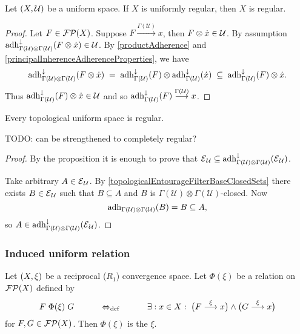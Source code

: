 \begin{proposition}
Let $\sSet{X,\mathcal{U}}$ be a uniform space. If $X$ is uniformly regular, then $X$ is regular.
\end{proposition}
\begin{proof}
Let $F\in \operatorname{\mathcal{FP}}(X)$. Suppose $F\overset{\Gamma(\mathcal{U})}{\longrightarrow} x$, then $F\otimes \dot{x} \in \mathcal{U}$. By assumption $\operatorname{adh}_{\Gamma(\mathcal{U})\otimes \Gamma(\mathcal{U})}^\downarrow(F\otimes \dot{x}) \in \mathcal{U}$. By \ref{productAdherence} and \ref{principalInherenceAdherenceProperties}, we have
\[ \operatorname{adh}_{\Gamma(\mathcal{U})\otimes \Gamma(\mathcal{U})}^\downarrow(F\otimes \dot{x}) \; = \; \operatorname{adh}_{\Gamma(\mathcal{U})}^\downarrow(F)\otimes \operatorname{adh}_{\Gamma(\mathcal{U})}^\downarrow(\dot{x}) \; \subseteq \; \operatorname{adh}_{\Gamma(\mathcal{U})}^\downarrow(F)\otimes \dot{x}. \]
Thus $\operatorname{adh}_{\Gamma(\mathcal{U})}^\downarrow(F)\otimes \dot{x} \in\mathcal{U}$ and so $\operatorname{adh}_{\Gamma(\mathcal{U})}^\downarrow(F) \overset{\Gamma(\mathcal{U})}{\longrightarrow} x$.
\end{proof}
\begin{corollary} \label{topologicalUniformSpaceRegular}
Every topological uniform space is regular.
\end{corollary}
TODO: can be strengthened to completely regular?
\begin{proof}
By the proposition it is enough to prove that $\operatorname{\mathcal{E}}_\mathcal{U} \subseteq \operatorname{adh}_{\Gamma(\mathcal{U})\otimes \Gamma(\mathcal{U})}^\downarrow(\operatorname{\mathcal{E}}_\mathcal{U})$.

Take arbitrary $A\in \operatorname{\mathcal{E}}_\mathcal{U}$. By \ref{topologicalEntourageFilterBaseClosedSets} there exists $B\in \operatorname{\mathcal{E}}_\mathcal{U}$ such that $B\subseteq A$ and $B$ is $\Gamma(\mathcal{U})\otimes \Gamma(\mathcal{U})$-closed.
Now
\[ \operatorname{adh}_{\Gamma(\mathcal{U})\otimes \Gamma(\mathcal{U})}(B) = B \subseteq A, \]
so $A\in \operatorname{adh}_{\Gamma(\mathcal{U})\otimes \Gamma(\mathcal{U})}^\downarrow(\operatorname{\mathcal{E}}_\mathcal{U})$.
\end{proof}

\subsubsection{Induced uniform relation}
\begin{definition}
Let $\sSet{X,\xi}$ be a reciprocal ($R_1$) convergence space. Let $\Phi(\xi)$ be a relation on $\operatorname{\mathcal{FP}}(X)$ defined by
\[ F\mathrel{\Phi(\xi)}G \qquad\quad\Leftrightarrow_{\text{def}}\quad\qquad \exists: x\in X: \; \big(F\overset{\xi}{\longrightarrow} x\big) \land \big(G\overset{\xi}{\longrightarrow} x\big) \]
for $F,G\in\operatorname{\mathcal{FP}}(X)$.
Then $\Phi(\xi)$ is the  $\xi$.
\end{definition}

